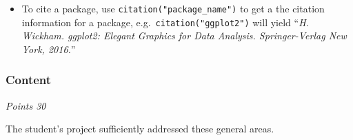 \documentclass[
  11pt,
]{article}
\providecommand{\tightlist}{%
  \setlength{\itemsep}{0pt}\setlength{\parskip}{0pt}}
\begin{document}
\begin{itemize}
\begin{itemize}
    \begin{itemize}
    \tightlist
    \item
      To cite a package, use \texttt{citation("package\_name")} to get a
      the citation information for a package,
      e.g.~\texttt{citation("ggplot2")} will yield ``\emph{H. Wickham.
      ggplot2: Elegant Graphics for Data Analysis. Springer-Verlag New
      York, 2016.}''
    \end{itemize}
  \end{itemize}
\end{itemize}

\hypertarget{content}{%
\subsubsection{Content}\label{content}}

\emph{Points 30}

The student's project sufficiently addressed these general areas.
\end{document}
